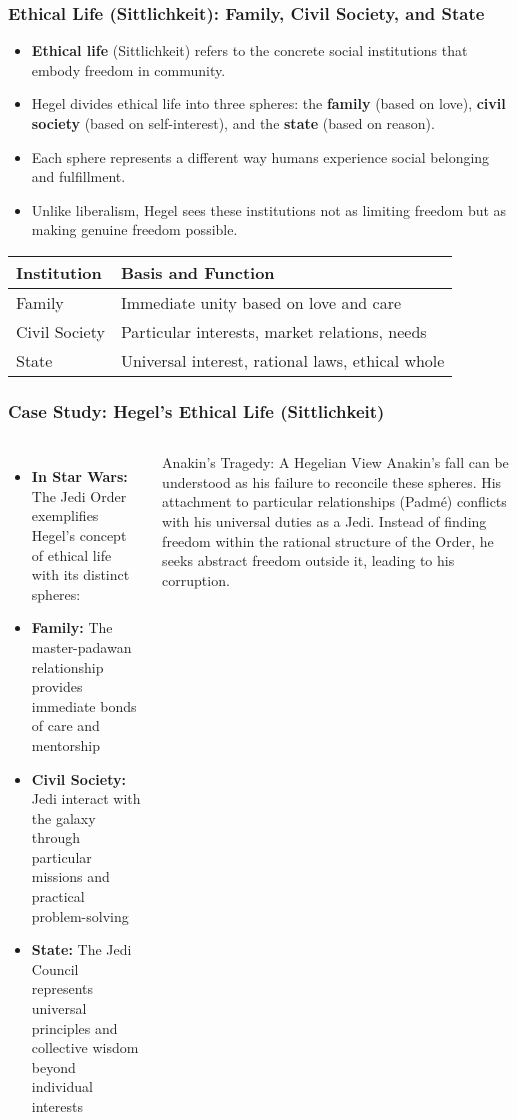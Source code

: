 \documentclass{beamer}
\begin{document}
\begin{frame}
\frametitle{Ethical Life (Sittlichkeit): Family, Civil Society, and State}
\begin{itemize}
    \item \textbf{Ethical life} (Sittlichkeit) refers to the concrete social institutions that embody freedom in community.
    \item Hegel divides ethical life into three spheres: the \textbf{family} (based on love), \textbf{civil society} (based on self-interest), and the \textbf{state} (based on reason).
    \item Each sphere represents a different way humans experience social belonging and fulfillment.
    \item Unlike liberalism, Hegel sees these institutions not as limiting freedom but as making genuine freedom possible.
\end{itemize}

\begin{center}
\begin{tabular}{p{3cm}p{7cm}}
\toprule
\textbf{Institution} & \textbf{Basis and Function} \\
\midrule
Family & Immediate unity based on love and care \\
Civil Society & Particular interests, market relations, needs \\
State & Universal interest, rational laws, ethical whole \\
\bottomrule
\end{tabular}
\end{center}
\end{frame}

\begin{frame}
    \frametitle{Case Study: Hegel's Ethical Life (Sittlichkeit)}
    \begin{columns}
    \begin{itemize}
        \item \textbf{In Star Wars:} The Jedi Order exemplifies Hegel's concept of ethical life with its distinct spheres:
        \item \textbf{Family:} The master-padawan relationship provides immediate bonds of care and mentorship
        \item \textbf{Civil Society:} Jedi interact with the galaxy through particular missions and practical problem-solving
        \item \textbf{State:} The Jedi Council represents universal principles and collective wisdom beyond individual interests
    \end{itemize}
    
    \begin{block}{Anakin's Tragedy: A Hegelian View}
    Anakin's fall can be understood as his failure to reconcile these spheres. His attachment to particular relationships (Padmé) conflicts with his universal duties as a Jedi. Instead of finding freedom within the rational structure of the Order, he seeks abstract freedom outside it, leading to his corruption.
    \end{block}
    \end{columns}
    \end{frame}
    
\end{document}

